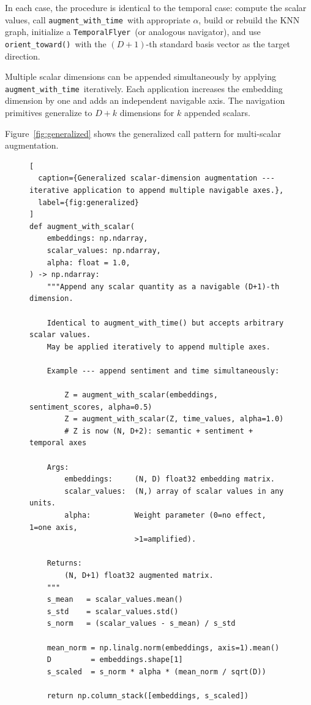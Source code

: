 \documentclass[12pt,letterpaper]{article}
\newcommand{\temporalflyer}{\texttt{TemporalFlyer}}
\newcommand{\augtime}{\texttt{augment\_with\_time}}
\newcommand{\orienttoward}{\texttt{orient\_toward()}}
\newcommand{\alphabar}{$\alpha$}
\begin{document}
In each case, the procedure is identical to the temporal case: compute the
scalar values, call \augtime\ with appropriate \alphabar, build or rebuild the
KNN graph, initialize a \temporalflyer\ (or analogous navigator), and use
\orienttoward\ with the $(D+1)$-th standard basis vector as the target
direction.

Multiple scalar dimensions can be appended simultaneously by applying
\augtime\ iteratively. Each application increases the embedding dimension by
one and adds an independent navigable axis. The navigation primitives
generalize to $D+k$ dimensions for $k$ appended scalars.

Figure~\ref{fig:generalized} shows the generalized call pattern for
multi-scalar augmentation.

\begin{figure}[H]
\begin{lstlisting}[
  caption={Generalized scalar-dimension augmentation --- iterative application to append multiple navigable axes.},
  label={fig:generalized}
]
def augment_with_scalar(
    embeddings: np.ndarray,
    scalar_values: np.ndarray,
    alpha: float = 1.0,
) -> np.ndarray:
    """Append any scalar quantity as a navigable (D+1)-th dimension.

    Identical to augment_with_time() but accepts arbitrary scalar values.
    May be applied iteratively to append multiple axes.

    Example --- append sentiment and time simultaneously:

        Z = augment_with_scalar(embeddings, sentiment_scores, alpha=0.5)
        Z = augment_with_scalar(Z, time_values, alpha=1.0)
        # Z is now (N, D+2): semantic + sentiment + temporal axes

    Args:
        embeddings:     (N, D) float32 embedding matrix.
        scalar_values:  (N,) array of scalar values in any units.
        alpha:          Weight parameter (0=no effect, 1=one axis,
                        >1=amplified).

    Returns:
        (N, D+1) float32 augmented matrix.
    """
    s_mean   = scalar_values.mean()
    s_std    = scalar_values.std()
    s_norm   = (scalar_values - s_mean) / s_std

    mean_norm = np.linalg.norm(embeddings, axis=1).mean()
    D         = embeddings.shape[1]
    s_scaled  = s_norm * alpha * (mean_norm / sqrt(D))

    return np.column_stack([embeddings, s_scaled])
\end{lstlisting}
\end{figure}
\end{document}
